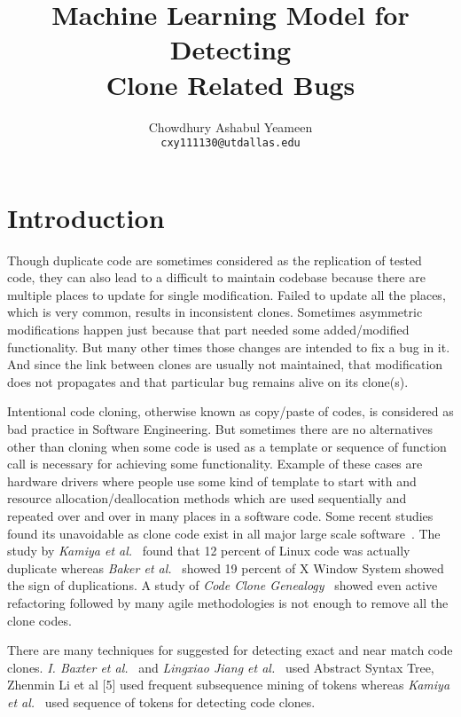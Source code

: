 \documentclass[11pt]{article}
\title{Machine Learning Model for Detecting \\Clone Related Bugs}
\author{Chowdhury Ashabul Yeameen\\
\texttt{cxy111130@utdallas.edu}}
\date{}
\begin{document}
\maketitle
			
\section{Introduction}
Though duplicate code are sometimes considered as the replication of tested code, they can also lead to a difficult to maintain codebase because there are multiple places to update for single modification. Failed to update all the places, which is very common, results in inconsistent clones. Sometimes asymmetric modifications happen just because that part needed some added/modified functionality. But many other times those changes are intended to fix a bug in it. And since the link between clones are usually not maintained, that modification does not propagates and that particular bug remains alive on its clone(s).

\vspace{10 pt}
Intentional code cloning, otherwise known as copy/paste of codes, is considered as bad practice in Software Engineering. But sometimes there are no alternatives other than cloning when some code is used as a template or sequence of function call is necessary for achieving some functionality. Example of these cases are hardware drivers where people use some kind of template to start with and resource allocation/deallocation methods which are used sequentially and repeated over and over in many places in a software code. Some recent studies found its unavoidable as clone code exist in all major large scale software~\cite{Li2006, Kamiya2002,Baker1995}. The study by \emph{Kamiya et al.}~\cite{Kamiya2002} found that 12 percent of Linux code was actually duplicate whereas \emph{Baker et al.}~\cite{Baker1995} showed 19 percent of X Window System showed the sign of duplications. A study of \emph{Code Clone Genealogy}~\cite{Kim2005} showed even active refactoring followed by many agile methodologies is not enough to remove all the clone codes.

\vspace{10 pt}
There are many techniques for suggested for detecting exact and near match code clones. \emph{I. Baxter et al.}~\cite{Baxter1998} and \emph{Lingxiao Jiang et al.}~\cite{Jiang2007} used Abstract Syntax Tree, Zhenmin Li et al [5] used frequent subsequence mining of tokens whereas \emph{Kamiya et al.}~\cite{Kamiya2002} used sequence of tokens for detecting code clones. 
\end{document}
